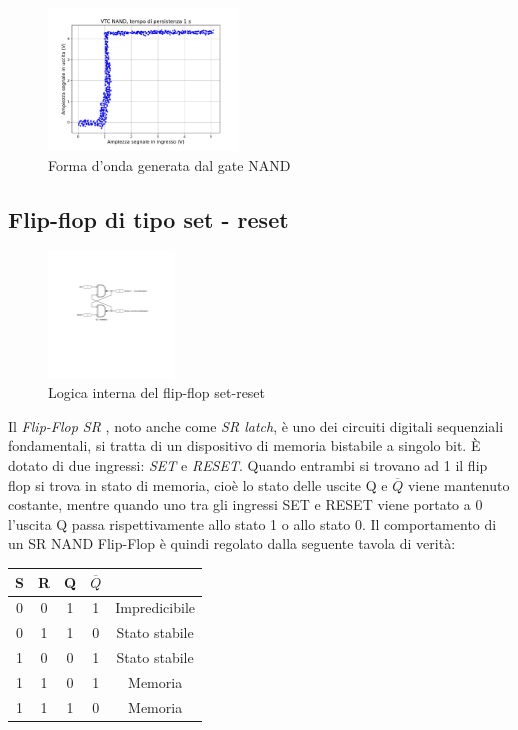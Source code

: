 \documentclass[journal]{IEEEtran}
\begin{document}
\begin{figure}[H]%
\begin{center}
\includegraphics[width=0.45\textwidth]{analysis/output/NAND-XY.pdf}
\caption{Forma d'onda generata dal gate NAND}
\label{fig:VTC NAND gate}
\end{center}
\end{figure}


\subsection{Flip-flop di tipo set - reset}
\begin{figure}[H]%
\begin{center}
\includegraphics[width=0.30\textwidth]{sch-simulations/digital/output/flip-flop-RS.pdf}
\caption{Logica interna del flip-flop set-reset}
\label{fig:circuit_flip_flop}
\end{center}
\end{figure}
Il \textit{Flip-Flop SR }, noto  anche come \textit{SR latch}, è uno dei circuiti digitali sequenziali fondamentali, si tratta di un dispositivo di memoria bistabile a singolo bit. È dotato di due ingressi: \textit{SET} e \textit{RESET}. Quando entrambi si trovano ad 1 il flip flop si trova in stato di memoria, cioè lo stato delle uscite Q e $ \overline{Q}$ viene mantenuto costante, mentre quando uno tra gli ingressi SET e RESET viene portato a 0 l'uscita Q passa rispettivamente allo stato 1 o allo stato 0.
Il comportamento di un SR NAND Flip-Flop è quindi regolato dalla seguente tavola di verità:
\begin{center}
\begin{tabular}{ |c|c|c|c|c| } 
 \hline
 \rowcolor{lightgray}
S & R & Q & $\overline{Q}$ &\\ \hline \hline
 0 & 0 & 1 & 1 & Impredicibile\\  \hline
 0 & 1 & 1 & 0 & Stato stabile\\ \hline
 1 & 0 & 0 & 1 & Stato stabile\\ \hline
 1 & 1 & 0 & 1 & Memoria\\ \hline
 1 & 1 & 1 & 0 & Memoria\\ \hline
 
 \hline
\end{tabular}
\end{center}
\end{document}
